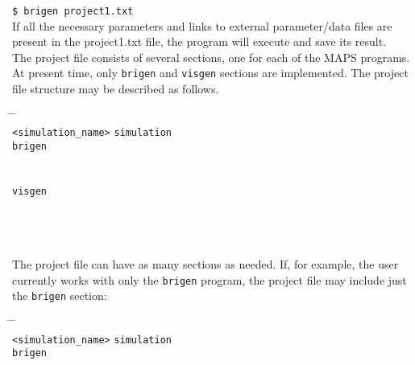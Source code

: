 \documentclass[letterpaper, oneside, 11pt]{article}
\begin{document}
{\tt \$ brigen project1.txt}\\

If all the necessary parameters and links to external parameter/data files are present in the project1.txt file, the program will execute and save its result. \\

The project file consists of several sections, one for each of the MAPS programs. At present time, only {\tt brigen} and {\tt visgen} sections are implemented. The project file structure may be described as follows.
\begin{tabbing}
\hspace{35mm} \= \hspace{20mm} \= \kill \\
{\tt <simulation\_name>} \> {\tt simulation} \\
{\tt brigen}  \\
\hspace{25mm} {\tt <brigen parameters>} \\
   \\
{\tt visgen}  \\
\hspace{25mm} {\tt <visgen parameters>} \\
   \\
    \\
\end{tabbing}

The project file can have as many sections as needed. If, for example, the user currently works with only the {\tt brigen} program, the project file may include just the {\tt brigen} section:

\begin{tabbing}
\hspace{35mm} \= \hspace{20mm} \= \kill \\
{\tt <simulation\_name>} \> {\tt simulation} \\
{\tt brigen}  \\
\hspace{25mm} {\tt <brigen parameters>} \\
   \\
    \\
\end{tabbing}
\end{document}
